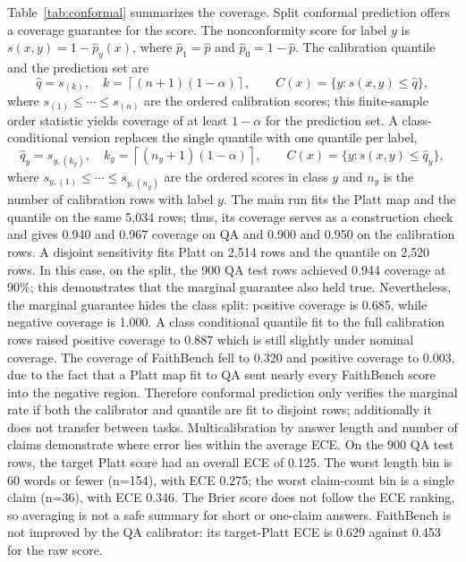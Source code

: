 \documentclass[a4paper,fleqn]{cas-sc}
\begin{document}
Table~\ref{tab:conformal} summarizes the coverage. Split conformal prediction offers a coverage guarantee for the score. The nonconformity score for label $y$ is $s(x,y)=1-\hat{p}_y(x)$, where $\hat{p}_1=\hat{p}$ and $\hat{p}_0=1-\hat{p}$. The calibration quantile and the prediction set are
\begin{equation}
  \hat{q} = s_{(k)}, \quad k = \left\lceil (n+1)(1-\alpha) \right\rceil,
  \qquad
  C(x) = \{y : s(x,y) \le \hat{q}\},
  \label{eq:conformal}
\end{equation}
where $s_{(1)} \le \cdots \le s_{(n)}$ are the ordered calibration scores; this finite-sample order statistic yields coverage of at least $1-\alpha$ for the prediction set. A class-conditional version replaces the single quantile with one quantile per label,
\begin{equation}
  \hat{q}_y = s_{y,(k_y)}, \quad k_y = \left\lceil (n_y+1)(1-\alpha) \right\rceil,
  \qquad
  C(x) = \{y : s(x,y) \le \hat{q}_y\},
  \label{eq:conformal_class}
\end{equation}
where $s_{y,(1)} \le \cdots \le s_{y,(n_y)}$ are the ordered scores in class $y$ and $n_y$ is the number of calibration rows with label $y$.
The main run fits the Platt map and the quantile on the same 5{,}034 rows; thus, its coverage serves as a construction check and gives 0.940 and 0.967 coverage on QA and 0.900 and 0.950 on the calibration rows. A disjoint sensitivity fits Platt on 2{,}514 rows and the quantile on 2{,}520 rows. In this case, on the split, the 900 QA test rows achieved 0.944 coverage at 90\%; this demonstrates that the marginal guarantee also held true. Nevertheless, the marginal guarantee hides the class split: positive coverage is 0.685, while negative coverage is 1.000. A class conditional quantile fit to the full calibration rows raised positive coverage to 0.887 which is still slightly under nominal coverage. The coverage of FaithBench fell to 0.320 and positive coverage to 0.003, due to the fact that a Platt map fit to QA sent nearly every FaithBench score into the negative region. Therefore conformal prediction only verifies the marginal rate if both the calibrator and quantile are fit to disjoint rows; additionally it does not transfer between tasks. Multicalibration by answer length and number of claims demonstrate where error lies within the average ECE. On the 900 QA test rows, the target Platt score had an overall ECE of 0.125. The worst length bin is 60 words or fewer (n=154), with ECE 0.275; the worst claim-count bin is a single claim (n=36), with ECE 0.346. The Brier score does not follow the ECE ranking, so averaging is not a safe summary for short or one-claim answers. FaithBench is not improved by the QA calibrator: its target-Platt ECE is 0.629 against 0.453 for the raw score.
\end{document}
